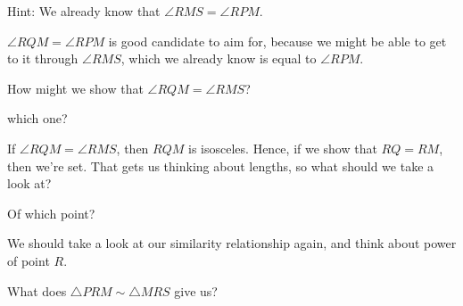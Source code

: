 Hint: We already know that $\angle RMS=\angle RPM$.


$\angle RQM = \angle RPM$ is good candidate to aim for, because we might be able to get to it through $\angle RMS$, which we already know is equal to $\angle RPM$.

How might we show that $\angle RQM = \angle RMS$?

which one?





If $\angle RQM = \angle RMS$, then $RQM$ is isosceles. Hence, if we show that $RQ = RM$, then we're set. That gets us thinking about lengths, so what should we take a look at?


Of which point?






We should take a look at our similarity relationship again, and think about power of point $R$.

What does $\triangle PRM \sim \triangle MRS$ give us?


